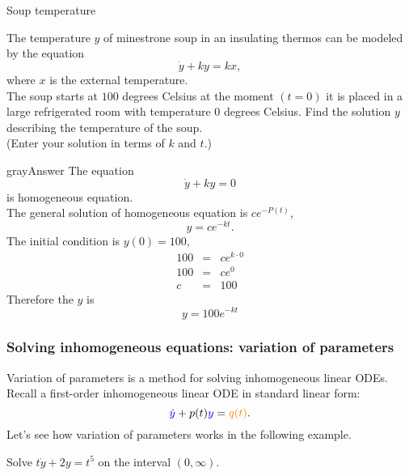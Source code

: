 \begin{problem}
  Soup temperature
\end{problem}
The temperature $y$ of minestrone soup in an insulating thermos can be modeled by the equation
\begin{equation*}
  \dot y + ky = kx, 
\end{equation*}
where $x$ is the external temperature.\\
The soup starts at $100$ degrees Celsius at the moment $(t = 0)$ it is placed in a large
refrigerated room with temperature $0$ degrees Celsius.
Find the solution $y$ describing the temperature of the soup.\\
(Enter your solution in terms of $k$ and $t$.)
\begin{mybox}{gray}{Answer}
  The equation
  \begin{equation*}
    \dot y + ky = 0 
  \end{equation*}
  is homogeneous equation.\\
  
  The general solution of homogeneous equation is $\displaystyle ce^{-P(t)}$, 
  \begin{equation*}
    y = ce^{-kt}.
  \end{equation*}
  The initial condition is $y(0) = 100$,
  \begin{eqnarray*}
    100 &=& ce^{k \cdot 0}\\
    100 &=& ce^0\\
    c &=& 100
  \end{eqnarray*}
  Therefore the $y$ is
  \begin{equation*}
    y = 100e^{-kt}
  \end{equation*}  
\end{mybox}
\clearpage

\subsubsection{Solving inhomogeneous equations: variation of parameters}
{\color{blue} Variation of parameters} is a method for solving inhomogeneous linear ODEs.
Recall a first-order inhomogeneous linear ODE in standard linear form:
\begin{equation*}
  {\color{blue}{\dot{y}}}  + p(t) {\color{blue}{y}}  = {\color{orange}{q(t)}} .
\end{equation*}
Let's see how variation of parameters works in the following example.
\begin{example}
  Solve $t\dot{y} + 2y = t^5$ on the interval $(0, \infty)$.
\end{example}

